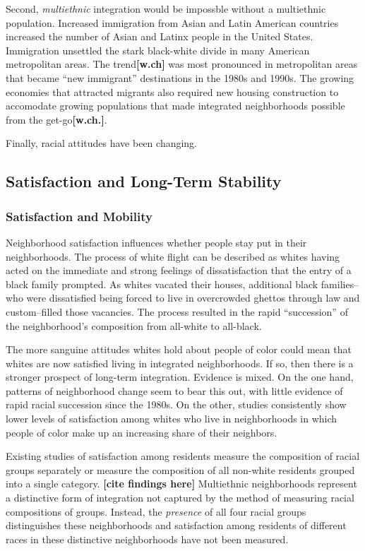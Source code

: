 \documentclass{baderart}
\begin{document}
Second, \emph{multiethnic} integration would be impossble without a multiethnic population. Increased immigration from Asian and Latin American countries increased the number of Asian and Latinx people in the United States. Immigration unsettled the stark black-white divide in many American metropolitan areas. The trend\textbf{{[}w.ch{]}} was most pronounced in metropolitan areas that became ``new immigrant'' destinations in the 1980s and 1990s. The growing economies that attracted migrants also required new housing construction to accomodate growing populations that made integrated neighborhoods possible from the get-go\textbf{{[}w.ch.{]}}.

Finally, racial attitudes have been changing.

\subsection{Satisfaction and Long-Term
Stability}\label{satisfaction-and-long-term-stability}

\subsubsection{Satisfaction and
Mobility}\label{satisfaction-and-mobility}

Neighborhood satisfaction influences whether people stay put in their
neighborhoods. The process of white flight can be described as whites
having acted on the immediate and strong feelings of dissatisfaction
that the entry of a black family prompted. As whites vacated their
houses, additional black families--who were dissatisfied being forced to
live in overcrowded ghettos through law and custom--filled those
vacancies. The process resulted in the rapid ``succession'' of the
neighborhood's composition from all-white to all-black.

The more sanguine attitudes whites hold about people of color could mean
that whites are now satisfied living in integrated neighborhoods. If so,
then there is a stronger prospect of long-term integration. Evidence is
mixed. On the one hand, patterns of neighborhood change seem to bear
this out, with little evidence of rapid racial succession since the
1980s. On the other, studies consistently show lower levels of
satisfaction among whites who live in neighborhoods in which people of
color make up an increasing share of their neighbors.

Existing studies of satisfaction among residents measure the composition
of racial groups separately or measure the composition of all non-white
residents grouped into a single category. \textbf{{[}cite findings
here{]}} Multiethnic neighborhoods represent a distinctive form of
integration not captured by the method of measuring racial compositions
of groups. Instead, the \emph{presence} of all four racial groups
distinguishes these neighborhoods and satisfaction among residents of
different races in these distinctive neighborhoods have not been
measured.
\end{document}
